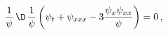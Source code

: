 \begin{equation*}
\frac{1}{\psi}\,\D\,\frac{1}{\psi} \left(\psi_t + \psi_{xxx} -
3\frac{\psi_x\psi_{xx}}{\psi}\right) = 0\,,
\end{equation*}

